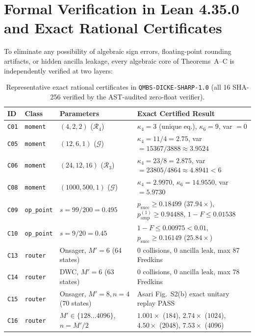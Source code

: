 \documentclass[11pt,a4paper]{article}
\theoremstyle{remark}
\begin{document}
\section{Formal Verification in Lean 4.35.0 and Exact Rational Certificates}
\label{sec:verification}

To eliminate any possibility of algebraic sign errors, floating-point rounding artifacts, or hidden ancilla leakage, every algebraic core of Theorems~A--C is independently verified at two layers:

\begin{table}[t]
\centering
\caption{Representative exact rational certificates in \texttt{QMBS-DICKE-SHARP-1.0} (all 16 SHA-256 verified by the AST-audited zero-float verifier).}
\label{tab:certs}
\footnotesize
\setlength{\tabcolsep}{4pt}
\begin{tabular}{@{}llll@{}}
\toprule
ID & Class & Parameters & Exact Certified Result \\
\midrule
\texttt{C01} & \texttt{moment} & $(4, 2, 2)$ ($\mathcal{R}_4$) & $\kappa_4 = 3$ (unique eq.), $\kappa_6 = 9$, var $= 0$ \\
\texttt{C05} & \texttt{moment} & $(12, 6, 1)$ ($\mathcal{G}$) & $\kappa_4 = 11/4 = 2.75$, var $= 15367/3888 \approx 3.9524$ \\
\texttt{C06} & \texttt{moment} & $(24, 12, 16)$ ($\mathcal{R}_3$) & $\kappa_4 = 23/8 = 2.875$, var $= 23805/4864 \approx 4.8941 < 6$ \\
\texttt{C08} & \texttt{moment} & $(1000, 500, 1)$ ($\mathcal{G}$) & $\kappa_4 = 2.9970$, $\kappa_6 = 14.9550$, var $= 5.9730$ \\
\texttt{C09} & \texttt{op\_point} & $s = 99/200 = 0.495$ & $p_{\mathrm{succ}} \ge 0.18499$ ($37.94\times$), $p_{\mathrm{amp}}^{(1)} \ge 0.94488$, $1{-}F \le 0.01538$ \\
\texttt{C10} & \texttt{op\_point} & $s = 9/20 = 0.45$ & $1{-}F \le 0.00975 < 0.01$, $p_{\mathrm{succ}} \ge 0.16149$ ($25.84\times$) \\
\texttt{C13} & \texttt{router} & Onsager, $M'=6$ (64 states) & 0 collisions, 0 ancilla leak, max 87 Fredkins \\
\texttt{C14} & \texttt{router} & DWC, $M'=6$ (63 states) & 0 collisions, 0 ancilla leak, max 78 Fredkins \\
\texttt{C15} & \texttt{router} & Onsager, $M'=8, n=4$ (70 states) & Asari Fig.~S2(b) exact unitary replay PASS \\
\texttt{C16} & \texttt{router} & $M' \in \{128\dots 4096\}$, $n=M'/2$ & $1.001\times$ ($184$), $2.74\times$ ($1024$), $4.50\times$ ($2048$), $7.53\times$ ($4096$) \\
\bottomrule
\end{tabular}
\end{table}
\end{document}
